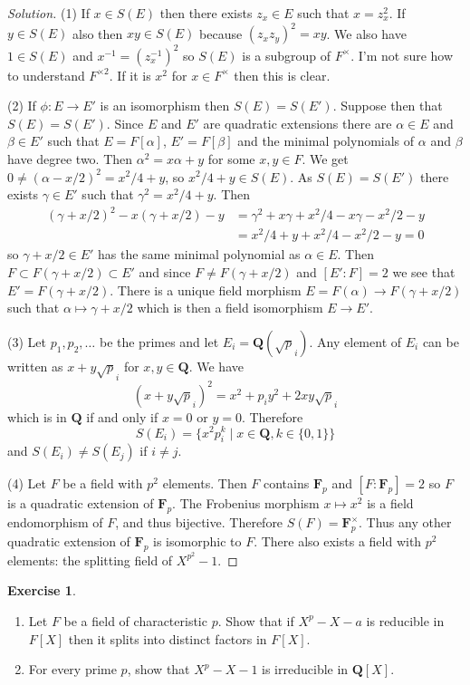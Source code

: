 \documentclass[11pt]{amsart}
\theoremstyle{definition}
\newtheorem{e}[theo]{Exercise}
\newenvironment{s}{\begin{proof}[Solution]}{\end{proof}}
\def\FF{\mathbf{F}}
\def\QQ{\mathbf{Q}}
\begin{document}
\begin{s}
(1) If $x \in S(E)$ then there exists $z_x \in E$ such that $x = z_x^2$.
If $y \in S(E)$ also then $xy \in S(E)$ because $(z_x z_y)^2 = xy$.
We also have $1 \in S(E)$ and $x^{-1} = (z_x^{-1})^2$ so $S(E)$ is a subgroup of $F^\times$.
I'm not sure how to understand $F^{\times 2}$.
If it is $x^2$ for $x \in F^\times$ then this is clear.

(2) If $\phi : E \to E'$ is an isomorphism then $S(E) = S(E')$.
Suppose then that $S(E) = S(E')$.
Since $E$ and $E'$ are quadratic extensions there are $\alpha \in E$ and $\beta \in E'$ such that $E = F[\alpha]$, $E' = F[\beta]$ and the minimal polynomials of $\alpha$ and $\beta$ have degree two.
Then $\alpha^2 = x \alpha + y$ for some $x,y \in F$.
We get $0 \not= (\alpha - x/2)^2 = x^2/4 + y$, so $x^2/4 + y \in S(E)$.
As $S(E) = S(E')$ there exists $\gamma \in E'$ such that $\gamma^2 = x^2/4 + y$.
Then
\begin{align*}
(\gamma + x/2)^2 - x(\gamma + x/2) - y
&= \gamma^2 + x \gamma + x^2/4 - x \gamma - x^2/2 - y
\\
&= x^2/4 + y + x^2/4 - x^2/2 - y
= 0
\end{align*}
so $\gamma + x/2 \in E'$ has the same minimal polynomial as $\alpha \in E$.
Then $F \subset F(\gamma + x/2) \subset E'$ and since $F \not= F(\gamma+x/2)$ and $[E':F] = 2$ we see that $E' = F(\gamma + x/2)$.
There is a unique field morphism $E = F(\alpha) \to F(\gamma + x/2)$ such that $\alpha \mapsto \gamma+x/2$ which is then a field isomorphism $E \to E'$.

(3) Let $p_1, p_2, \ldots$ be the primes and let $E_i = \QQ(\sqrt p_i)$.
Any element of $E_i$ can be written as $x + y\sqrt p_i$ for $x,y \in \QQ$.
We have
\[
(x + y \sqrt p_i)^2 = x^2 + p_i y^2 + 2 xy \sqrt p_i
\]
which is in $\QQ$ if and only if $x = 0$ or $y = 0$.
Therefore
\[
S(E_i) = \{ x^2 p_i^k \mid x \in \QQ, k \in \{0, 1\} \}
\]
and $S(E_i) \not= S(E_j)$ if $i \not= j$.

(4)
Let $F$ be a field with $p^2$ elements.
Then $F$ contains $\FF_p$ and $[F:\FF_p] = 2$ so $F$ is a quadratic extension of $\FF_p$.
The Frobenius morphism $x \mapsto x^2$ is a field endomorphism of $F$, and thus bijective.
Therefore $S(F) = \FF_p^\times$.
Thus any other quadratic extension of $\FF_p$ is isomorphic to $F$.
There also exists a field with $p^2$ elements: the splitting field of $X^{p^2} - 1$.
\end{s}


\begin{e}
\begin{enumerate}
\item
Let $F$ be a field of characteristic $p$.
Show that if $X^p - X - a$ is reducible in $F[X]$ then it splits into distinct factors in $F[X]$.

\item
For every prime $p$, show that $X^p -X - 1$ is irreducible in $\QQ[X]$.
\end{enumerate}
\end{e}
\end{document}
